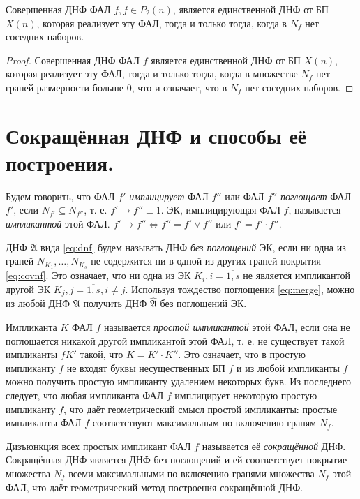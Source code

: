 \documentclass[11pt]{article}
\def\zall{\setcounter{lem}{0}\setcounter{cnsqnc}{0}\setcounter{th}{0}\setcounter{Cmt}{0}\setcounter{equation}{0}\setcounter{stnmt}{0}}
\newcounter{lem}\setcounter{lem}{0}
\def\lm{\par\smallskip\refstepcounter{lem}\textbf{\arabic{lem}}}
\newtheorem*{Lemma}{Лемма \lm}
\newcounter{th}\setcounter{th}{0}
\newcounter{cnsqnc}\setcounter{cnsqnc}{0}
\newcounter{Cmt}\setcounter{Cmt}{0}
\newcounter{stnmt}\setcounter{stnmt}{0}
\begin{document}
\begin{Lemma}
Совершенная ДНФ ФАЛ $f, f \in P_2(n)$, является единственной ДНФ от БП $X(n)$, которая реализует эту ФАЛ, тогда и только тогда, когда в $N_f$ нет соседних наборов.
\end{Lemma}
\begin{proof}
Совершенная ДНФ ФАЛ $f$ является единственной ДНФ от БП $X(n)$, которая реализует эту ФАЛ, тогда и только тогда, когда в множестве $N_f$ нет граней размерности больше 0, что и означает, что в $N_f$ нет соседних наборов.
\end{proof}
\pagebreak
\zall
\section{Сокращённая ДНФ и способы её построения.}
\label{sec:orgc5f4e66}
Будем говорить, что ФАЛ \(f'\) \emph{имплицирует} ФАЛ \(f''\) или ФАЛ \(f''\) \emph{поглощает} ФАЛ \(f'\), если \(N_{f'} \subseteq N_{f''}\), т. е. \(f' \rightarrow f'' \equiv 1\). ЭК, имплицирующая ФАЛ \(f\), называется \emph{импликантой} этой ФАЛ. \(f' \rightarrow f'' \Leftrightarrow f'' = f'\lor f'' \text{ или } f' = f'\cdot f''\).

ДНФ \(\mathfrak{A}\) вида \eqref{eq:dnf} будем называть ДНФ \emph{без поглощений} ЭК, если ни одна из граней \(N_{K_1}, \ldots, N_{K_s}\) не содержится ни в одной из других граней покрытия \eqref{eq:covnf}. Это означает, что ни одна из ЭК \(K_i, i = \overline{1, s}\) не является импликантой другой ЭК \(K_j, j = \overline{1, s}, i \neq j\). Используя тождество поглощения \eqref{eq:merge}, можно из любой ДНФ \(\mathfrak{A}\) получить ДНФ \(\widehat{\mathfrak{A}}\) без поглощений ЭК.

Импликанта \(K\) ФАЛ \(f\) называется \emph{простой импликантой} этой ФАЛ, если она не поглощается никакой другой импликантой этой ФАЛ, т. е. не существует такой импликанты \(f K'\) такой, что \(K = K'\cdot K''\). Это означает, что в простую импликанту \(f\) не входят буквы несущественных БП \(f\) и из любой импликанты \(f\) можно получить простую импликанту удалением некоторых букв. Из последнего следует, что любая импликанта ФАЛ \(f\) имплицирует некоторую простую импликанту \(f\), что даёт геометрический смысл простой импликанты: простые импликанты ФАЛ \(f\) соответствуют максимальным по включению граням \(N_f\).

Дизъюнкция всех простых импликант ФАЛ \(f\) называется её \emph{сокращённой} ДНФ. Сокращённая ДНФ является ДНФ без поглощений и ей соответствует покрытие множества \(N_f\) всеми максимальными по включению гранями множества \(N_f\) этой ФАЛ, что даёт геометрический метод построения сокращённой ДНФ.
\end{document}

